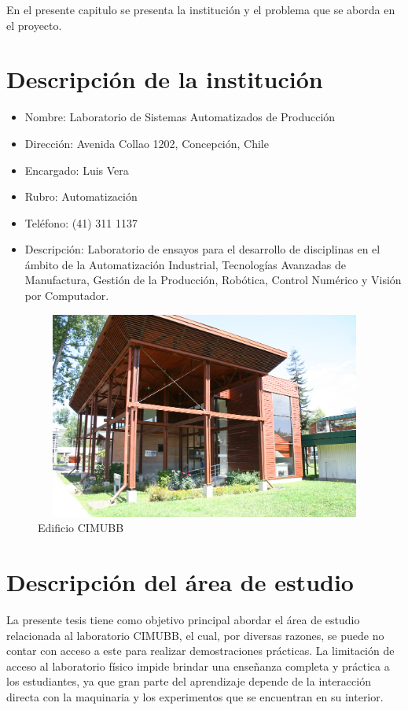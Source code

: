 En el presente capitulo se presenta la institución y el problema que se aborda en el proyecto.

\section{Descripción de la institución}
\begin{itemize}
\item Nombre: Laboratorio de Sistemas Automatizados de Producción
\item Dirección: Avenida Collao 1202, Concepción, Chile
\item Encargado: Luis Vera
\item Rubro: Automatización
\item Teléfono: (41) 311 1137
\item Descripción: Laboratorio de ensayos para el desarrollo de disciplinas en el ámbito de la Automatización Industrial, Tecnologías Avanzadas de Manufactura, Gestión de la Producción, Robótica, Control Numérico y Visión por Computador.
\end{itemize}

\begin{figure}[h]
\centering
\includegraphics[width=13cm, height=6.8cm]{figures/cimubbfuera.jpg}
\caption{Edificio CIMUBB}
\label{fig:cimubbfuera}
\end{figure}

\clearpage
\section{Descripción del área de estudio}
La presente tesis tiene como objetivo principal abordar el área de estudio relacionada al laboratorio CIMUBB, el cual, por diversas razones, se puede no contar con acceso a este para realizar demostraciones prácticas. La limitación de acceso al laboratorio físico impide brindar una enseñanza completa y práctica a los estudiantes, ya que gran parte del aprendizaje depende de la interacción directa con la maquinaria y los experimentos que se encuentran en su interior.

